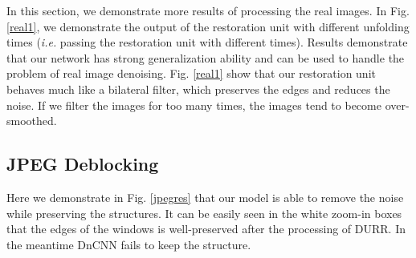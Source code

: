 \documentclass{article} %
\begin{document}
In this section, we demonstrate more results of processing the real images.
In Fig. \ref{real1},
we demonstrate the output of the restoration unit with
different unfolding times (\textit{i.e.} passing the restoration unit
with different times). Results demonstrate that our network has
strong generalization ability and can be used to handle the problem
of real image denoising. Fig. \ref{real1}
show that our restoration unit behaves much like a bilateral filter,
which preserves the edges and reduces the noise.
If we filter the images for too many times, the images
tend to become over-smoothed.


\subsection{JPEG Deblocking}

Here we demonstrate in Fig. \ref{jpegres} that our model is
able to remove the noise while preserving the structures. It
can be easily seen in the white zoom-in boxes that the edges of
the windows is well-preserved after the processing of DURR. In
the meantime DnCNN fails to keep the structure.
\end{document}
